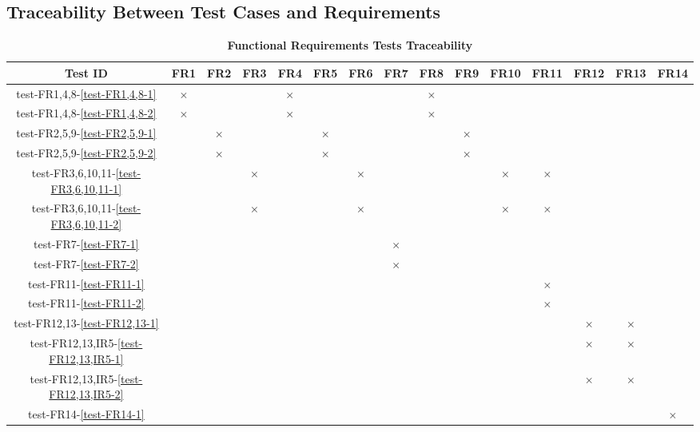 \documentclass[12pt, titlepage]{article}
\begin{document}
\newpage


\begin{landscape}
\subsection{Traceability Between Test Cases and Requirements} \label{section:4.4}

\begin{table}[H]
  \centering
  \begin{tabular}{|c|c|c|c|c|c|c|c|c|c|c|c|c|c|c|}
  \hline
   Test ID & FR1 & FR2 & FR3 & FR4 & FR5 & FR6 & FR7 & FR8 & FR9 & FR10 & FR11 & FR12 & FR13 & FR14\\
  \hline
  test-FR1,4,8-\ref{test-FR1,4,8-1} & $\times$ & & & $\times$ & & & & $\times$ & & & & & & \\
  \hline
  test-FR1,4,8-\ref{test-FR1,4,8-2} & $\times$ & & & $\times$ & & & & $\times$ & & & & & & \\
  \hline
  test-FR2,5,9-\ref{test-FR2,5,9-1} & & $\times$ & & & $\times$ & & & & $\times$ & & & & & \\
  \hline
  test-FR2,5,9-\ref{test-FR2,5,9-2} & & $\times$ & & & $\times$ & & & & $\times$ & & & & & \\
  \hline
  test-FR3,6,10,11-\ref{test-FR3,6,10,11-1} & & & $\times$ & & & $\times$ & & & & $\times$ & $\times$ & & & \\
  \hline
  test-FR3,6,10,11-\ref{test-FR3,6,10,11-2} & & & $\times$ & & & $\times$ & & & & $\times$ & $\times$ & & & \\
  \hline
  test-FR7-\ref{test-FR7-1} & & & & & & & $\times$ & & & & & & & \\
  \hline
  test-FR7-\ref{test-FR7-2} & & & & & & & $\times$ & & & & & & & \\
  \hline
  test-FR11-\ref{test-FR11-1} & & & & & & & & & & & $\times$ & & & \\
  \hline
  test-FR11-\ref{test-FR11-2} & & & & & & & & & & & $\times$ & & & \\
  \hline
  test-FR12,13-\ref{test-FR12,13-1} & & & & & & & & & & & & $\times$ & $\times$ & \\
  \hline
  test-FR12,13,IR5-\ref{test-FR12,13,IR5-1} & & & & & & & & & & & & $\times$ & $\times$ & \\
  \hline
  test-FR12,13,IR5-\ref{test-FR12,13,IR5-2} & & & & & & & & & & & & $\times$ & $\times$ & \\
  \hline
  test-FR14-\ref{test-FR14-1} & & & & & & & & & & & & & & $\times$ \\
  \hline
\end{tabular}
\caption{\bf Functional Requirements Tests Traceability} \label{tab:fr-test-traceability}
\end{table}



\end{landscape}
\end{document}
